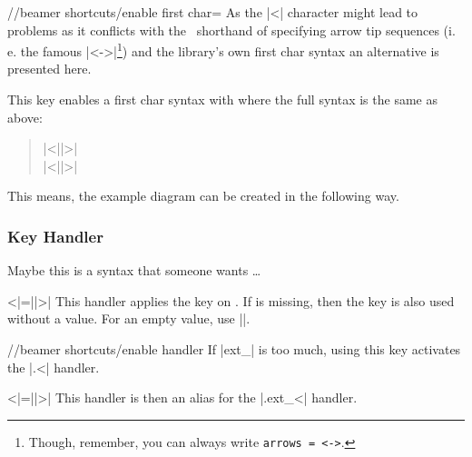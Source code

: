 \begin{key}{/\tikzext/beamer shortcuts/enable first char=}
  As the |<| character might lead to problems as it conflicts with the \tikzname\ shorthand
  of specifying arrow tip sequences
  (i.\,e. the famous |<->|\footnote{Though, remember, you can always write \texttt{arrows = <->}.})
  and the  library's own first char syntax
  an alternative is presented here.
  
  This key enables a first char syntax with  where the full syntax is the same as above:
  \begin{quote}
      |<||>|\\
      |<||>|
  \end{quote}
  
  This means, the example diagram can be created in the following way.
\begin{codeexample}[preamble=\usetikzlibrary{ext.beamer} \setbeamercovered{transparent},code only]
\end{codeexample}
\end{key}

\subsubsection{Key Handler}
Maybe this is a syntax that someone wants \dots
\begin{ext_handler}{{<}|=||>|}
  This handler applies the key on .
  If  is missing, then the key is also used without a value.
  For an empty value, use |{}|.
  \begin{key}{/\tikzext/beamer shortcuts/enable handler}
    If |ext_| is too much, using this key activates the |.<| handler.
    \begin{handler}{{<}|=||>|}
      This handler is then an alias for the |.ext_<| handler.
    \end{handler}
  \end{key}
\end{ext_handler}
\endinput